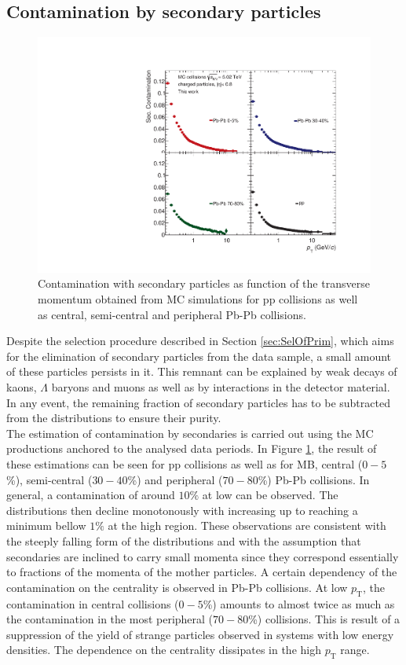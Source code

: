 \documentclass[12pt,a4paper]{report}
\begin{document}
\subsection{Contamination by secondary particles}
\begin{figure}[tb!]
\centering
\includegraphics[width=12cm]{Plots/secCont.pdf}  
\caption{Contamination with secondary particles as function of the transverse momentum obtained from MC simulations for pp collisions as well as central, semi-central and peripheral Pb-Pb collisions. }
\label{SecCont}
\end{figure}
Despite the selection procedure described in Section \ref{sec:SelOfPrim}, which aims for the elimination of secondary particles from the data sample, a small amount of these particles persists in it. This remnant can be explained by weak decays of kaons, $\Lambda$ baryons and muons as well as by interactions in the detector material. In any event, the remaining fraction of secondary particles has to be subtracted from the \pt distributions to ensure their purity.\\
The estimation of contamination by secondaries is carried out using the MC productions anchored to the analysed data periods. In Figure \ref{SecCont}, the result of these estimations can be seen for pp collisions as well as for MB, central ($0-5$\%), semi-central ($30-40$\%) and peripheral ($70-80$\%) Pb-Pb collisions. In general, a contamination of around  $10\%$ at low \pt can be observed. The distributions then decline monotonously with increasing \pt up to reaching a minimum bellow $1\%$ at the high \pt region. These observations are consistent with the steeply falling form of the \pt distributions and with the assumption that secondaries are inclined to carry small momenta since they correspond essentially to fractions of the momenta of the mother particles. A certain dependency of the contamination on the centrality is observed in Pb-Pb collisions. At low $p_\text{T}$, the contamination in central collisions ($0-5$\%) amounts to almost twice as much as the contamination in the most peripheral ($70-80$\%) collisions. This is result of a suppression of the yield of strange particles observed in systems with low energy densities. The dependence on the centrality dissipates in the high $p_\text{T}$ range.
\end{document}
